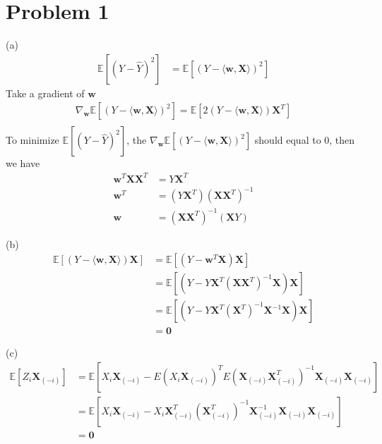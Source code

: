 \documentclass[twoside,11pt]{homework}
\begin{document}
\maketitle

\section*{Problem 1}
\indent
(a)
\begin{align*}
\mathbb{E}[(Y - \hat Y) ^ 2] &= \mathbb{E}[(Y - \langle \pmb w, \pmb X \rangle ) ^ 2] 
\end{align*}
Take a gradient of $\pmb w$
\begin{align*}
\nabla_ {\pmb w} \mathbb{E}[(Y - \langle \pmb w, \pmb X \rangle ) ^ 2] = \mathbb{E} [2 (Y - \langle \pmb w, \pmb X \rangle )  \pmb X ^ T ]\\
\end{align*}
To minimize $\mathbb{E}[(Y - \hat Y) ^ 2] $, the $\nabla_ {\pmb w} \mathbb{E}[(Y - \langle \pmb w, \pmb X \rangle ) ^ 2]$ should equal to 0, then we have
\begin{align*}
\pmb w^T \pmb X \pmb X ^ T &= Y \pmb X ^ T \\
\pmb w ^ T &= (Y \pmb X ^ T) (\pmb X \pmb X ^ T) ^ {-1} \\
\pmb w &=  (\pmb X \pmb X ^ T) ^ {-1} (\pmb X  Y) 
\end{align*}


(b) \\
\begin{align*}
\mathbb{E} [(Y - \langle \pmb w, \pmb X \rangle ) \pmb X]  & =  \mathbb{E} [(Y -  \pmb w ^ T \pmb X) \pmb X] \\
& = \mathbb{E} [(Y - Y \pmb X ^ T (\pmb X \pmb X ^ T) ^{-1} \pmb X) \pmb X] \\
& = \mathbb{E} [(Y - Y \pmb X ^ T  (\pmb X ^ T) ^ {-1} \pmb X ^ {-1} \pmb X) \pmb X] \\
& = \pmb 0
\end{align*}


(c) \\
\begin{align*}
\mathbb{E}[Z_i \pmb X_{(-i)}]  &= \mathbb{E} [X_i \pmb X_{(-i)} - E(X_i \pmb X_{(-i)} )^T E(\pmb X_{(-i)} \pmb X^T_{(-i)})^{-1}\pmb X_{(-i)}\pmb X_{(-i)}]\\
& =  \mathbb{E} [X_i \pmb X_{(-i)} - X_i \pmb X_{(-i)} ^T ( \pmb X_{(-i)}^T)^{-1} \pmb X_{(-i)}^{-1} \pmb X_{(-i)} \pmb X_{(-i)} ] \\
& = \pmb 0
\end{align*}
\end{document}
